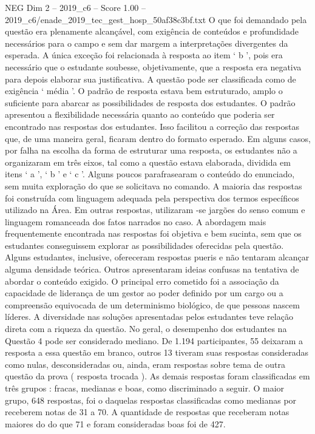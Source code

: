 \begin{textsample}{NEG Dim 2 – 2019\_c6 – Score 1.00 – 2019\_c6/enade\_2019\_tec\_gest\_hosp\_50af38c3bf.txt}
O que foi demandado pela questão era plenamente alcançável, com exigência de conteúdos e profundidade necessários para o campo e sem dar margem a interpretações divergentes da esperada.
A única exceção foi relacionada à resposta ao item ‘ b ’, pois era necessário que o estudante soubesse, objetivamente, que a resposta era negativa para depois elaborar sua justificativa.
A questão pode ser classificada como de exigência ‘ média ’.
O padrão de resposta estava bem estruturado, amplo o suficiente para abarcar as possibilidades de resposta dos estudantes.
O padrão apresentou a flexibilidade necessária quanto ao conteúdo que poderia ser encontrado nas respostas dos estudantes.
Isso facilitou a correção das respostas que, de uma maneira geral, ficaram dentro do formato esperado.
Em alguns casos, por falha na escolha da forma de estruturar uma resposta, os estudantes não a organizaram em três eixos, tal como a questão estava elaborada, dividida em itens ‘ a ’, ‘ b ’ e ‘ c ’.
Alguns poucos parafrasearam o conteúdo do enunciado, sem muita exploração do que se solicitava no comando.
A maioria das respostas foi construída com linguagem adequada pela perspectiva dos termos específicos utilizado na Área.
Em outras respostas, utilizaram -se jargões do senso comum e linguagem romanceada dos fatos narrados no caso.
A abordagem mais frequentemente encontrada nas respostas foi objetiva e bem sucinta, sem que os estudantes conseguissem explorar as possibilidades oferecidas pela questão.
Alguns estudantes, inclusive, ofereceram respostas pueris e não tentaram alcançar alguma densidade teórica.
Outros apresentaram ideias confusas na tentativa de abordar o conteúdo exigido.
O principal erro cometido foi a associação da capacidade de liderança de um gestor ao poder definido por um cargo ou a compreensão equivocada de um determinismo biológico, de que pessoas nascem líderes.
A diversidade nas soluções apresentadas pelos estudantes teve relação direta com a riqueza da questão.
No geral, o desempenho dos estudantes na Questão 4 pode ser considerado mediano.
De 1.194 participantes, 55 deixaram a resposta a essa questão em branco, outros 13 tiveram suas respostas consideradas como nulas, desconsideradas ou, ainda, eram respostas sobre tema de outra questão da prova ( resposta trocada ).
As demais respostas foram classificadas em três grupos : fracas, medianas e boas, como discriminado a seguir.
O maior grupo, 648 respostas, foi o daquelas respostas classificadas como medianas por receberem notas de 31 a 70.
A quantidade de respostas que receberam notas maiores do do que 71 e foram consideradas boas foi de 427.

\end{textsample}
